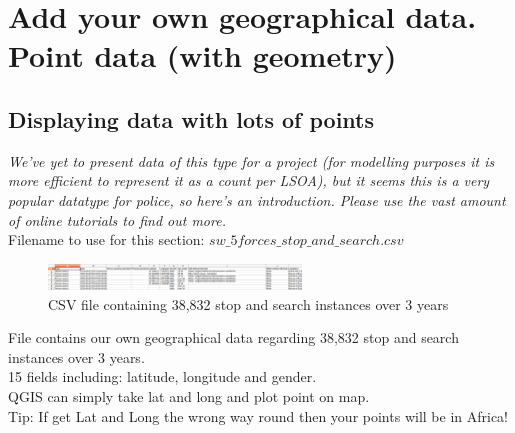 
\chapter{Add your own geographical data. Point data (with geometry)}

\pagestyle{fancy}
\fancyhf{}
\fancyhead[OC]{\leftmark}
\fancyhead[EC]{\rightmark}
\cfoot{\thepage}


\section{Displaying data with lots of points}

\textit{We've yet to present data of this type for a project (for modelling purposes it is more efficient to represent it as a count per LSOA), but it seems this is a very popular datatype for police, so here's an introduction. Please use the vast amount of online tutorials to find out more.}\\

Filename to use for this section: $sw\_5forces\_stop\_and\_search.csv$\\

\begin{figure}[!h]
	\centering
	\includegraphics[width=0.6\textwidth]{images/image1.png}
	\caption{CSV file containing 38,832 stop and search instances over 3 years}
	\label{ft_fig_firstfig3}
\end{figure}

File contains our own geographical data regarding 38,832 stop and search instances over 3 years.\\
15 fields including: latitude, longitude and gender.\\
QGIS can simply take lat and long and plot point on map.\\
Tip: If get Lat and Long the wrong way round then your points will be in Africa!\\

